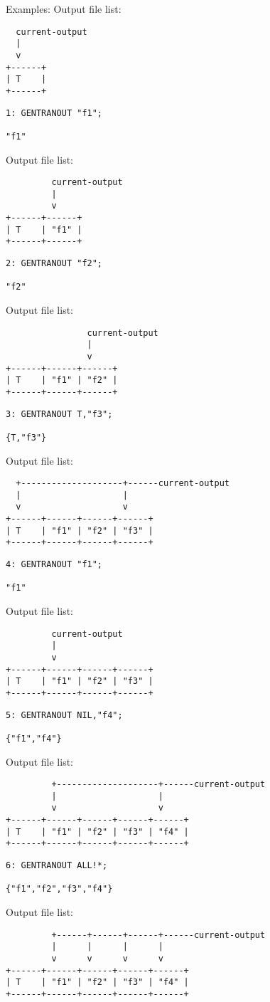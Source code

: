 \begin{describe}{Examples:}
Output file list:
\begin{verbatim}
  current-output
  |
  v
+------+
| T    |
+------+
\end{verbatim}
\begin{verbatim}
1: GENTRANOUT "f1"; 

"f1"
\end{verbatim}
Output file list:
\begin{verbatim}
         current-output
         |
         v
+------+------+
| T    | "f1" |
+------+------+
\end{verbatim}
\begin{verbatim}
2: GENTRANOUT "f2"; 

"f2"
\end{verbatim}
Output file list:
\begin{verbatim}
                current-output
                |
                v
+------+------+------+
| T    | "f1" | "f2" |
+------+------+------+
\end{verbatim}
\begin{verbatim}
3: GENTRANOUT T,"f3"; 

{T,"f3"}
\end{verbatim}
Output file list:
\begin{verbatim}
  +--------------------+------current-output
  |                    |
  v                    v
+------+------+------+------+
| T    | "f1" | "f2" | "f3" |
+------+------+------+------+
\end{verbatim}
\begin{verbatim}
4: GENTRANOUT "f1"; 

"f1"
\end{verbatim}
Output file list:
\begin{verbatim}
         current-output
         |
         v
+------+------+------+------+
| T    | "f1" | "f2" | "f3" |
+------+------+------+------+
\end{verbatim}
\begin{verbatim}
5: GENTRANOUT NIL,"f4"; 

{"f1","f4"}
\end{verbatim}
Output file list:
\begin{verbatim}
         +--------------------+------current-output
         |                    |
         v                    v
+------+------+------+------+------+
| T    | "f1" | "f2" | "f3" | "f4" |
+------+------+------+------+------+
\end{verbatim}
\begin{verbatim}
6: GENTRANOUT ALL!*; 

{"f1","f2","f3","f4"}
\end{verbatim}
Output file list:
\begin{verbatim}
         +------+------+------+------current-output
         |      |      |      |
         v      v      v      v
+------+------+------+------+------+
| T    | "f1" | "f2" | "f3" | "f4" |
+------+------+------+------+------+
\end{verbatim}
\end{describe}

